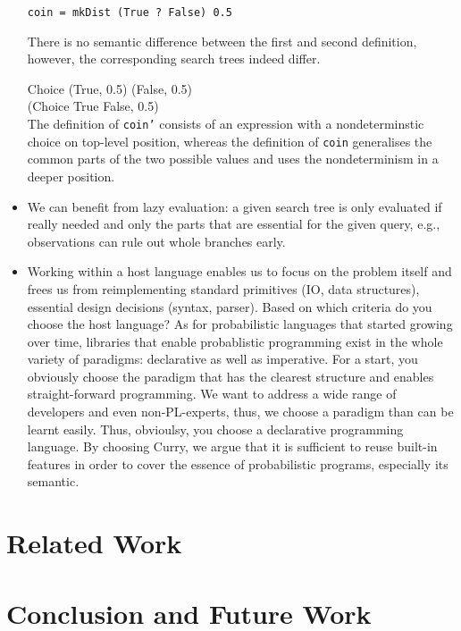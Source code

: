 \documentclass[
12pt, %
a4paper, %
oneside, %
]{llncs}
\newcommand{\code}[1]{{\texttt{#1}}}
\begin{document}
\begin{itemize}
\begin{verbatim}
coin = mkDist (True ? False) 0.5
\end{verbatim}

  There is no semantic difference between the first and second
  definition, however, the corresponding search trees indeed differ. %

  Choice (True, 0.5) (False, 0.5)\\%
  (Choice True False, 0.5)\\%

  The definition of \code{coin'} consists of an expression with a
  nondeterminstic choice on top-level position, whereas the definition
  of \code{coin} generalises the common parts of the two possible
  values and uses the nondeterminism in a deeper position. %


\item We can benefit from lazy evaluation: a given search tree is only
  evaluated if really needed and only the parts that are essential for
  the given query, e.g., observations can rule out whole branches
  early. %

\item Working within a host language enables us to focus on the
  problem itself and frees us from reimplementing standard primitives
  (IO, data structures), essential design decisions (syntax,
  parser). %
  Based on which criteria do you choose the host language? %
  As for probabilistic languages that started growing over time,
  libraries that enable probablistic programming exist in the whole
  variety of paradigms: declarative as well as imperative. %
  For a start, you obviously choose the paradigm that has the clearest
  structure and enables straight-forward programming. %
  We want to address a wide range of developers and even
  non-PL-experts, thus, we choose a paradigm than can be learnt
  easily. %
  Thus, obvioulsy, you choose a declarative programming language. %
  By choosing Curry, we argue that it is sufficient to reuse built-in
  features in order to cover the essence of probabilistic programs,
  especially its semantic. %
  
\end{itemize}

\section{Related Work}

\section{Conclusion and Future Work}



\end{document}
